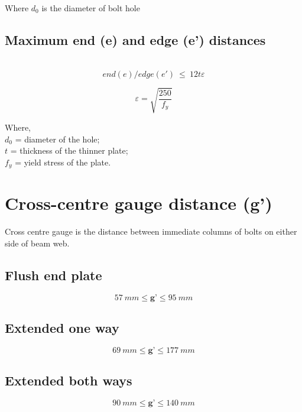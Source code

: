 \documentclass[11.5pt,a4paper,oneside]{report}
\begin{document}
\begin{Form}
Where $d_0$ is the diameter of bolt hole

\subsection{Maximum end (e) and edge (e') distances}
\qquad \qquad [Reference: Cl. 10.2.4.3, IS 800 : 2007]\\

\begin{equation}
{end (e)/edge (e')} ~ \leq ~ 12  t  \varepsilon
\end{equation}			

	\begin{equation}
		\varepsilon = \sqrt{\frac{250}{f_y}}
	\end{equation}
	
	Where, \\
	\indent $d_0$ = diameter of the hole; \\
	\indent $t$ = thickness of the thinner plate; \\
	\indent $f_y$ = yield stress of the plate.

				
\section{Cross-centre gauge distance (g')} 
Cross centre gauge is the distance between immediate columns of bolts on either side of beam web.

	\subsection{Flush end plate}
		\qquad {}
		\begin{equation}
		 	57~mm \leq \textbf{g'} \leq 95~mm 
		\end{equation}
		
	\subsection{Extended one way}
		\qquad {}
		\begin{equation}
			 69~mm \leq \textbf{g'} \leq 177~mm
		\end{equation}


	\subsection{Extended both ways}
		\qquad {}
		\begin{equation}
		90~mm \leq \textbf{g'} \leq 140~mm
		\end{equation}

\end{Form}
\end{document}
